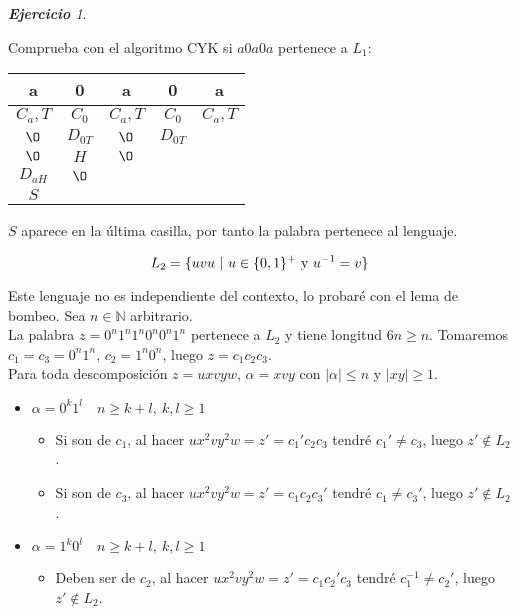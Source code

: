 \documentclass[12pt,spanish]{article}
\theoremstyle{definition}
\theoremstyle{remark}
\newtheorem{exercise}{\textbf{Ejercicio}}%
\begin{document}
\begin{exercise}
\begin{multicols}{4}
  \end{multicols}

  Comprueba con el algoritmo CYK si $a0a0a$ pertenece a $L_1$:

  \begin{table}[H]
    \centering
    \begin{tabular}{|c|cccc} \hline a & \multicolumn{1}{c|}{0} &
\multicolumn{1}{c|}{a} & \multicolumn{1}{c|}{0} &
\multicolumn{1}{c|}{a} \\ \hline $C_a,T$ & \multicolumn{1}{c|}{$C_0$}
& \multicolumn{1}{c|}{$C_a,T$} & \multicolumn{1}{c|}{$C_0$} &
\multicolumn{1}{c|}{$C_a,T$} \\ \hline $\O$ &
\multicolumn{1}{c|}{$D_{0T}$} & \multicolumn{1}{c|}{$\O$} & \multicolumn{1}{c|}{$D_{0T}$} & \\
\cline{1-4} $\O$ & \multicolumn{1}{c|}{$H$} &
\multicolumn{1}{c|}{$\O$} & & \\ \cline{1-3} $D_{aH}$ &
\multicolumn{1}{c|}{$\O$} & & & \\ \cline{1-2} $S$ & & & & \\
\cline{1-1}
    \end{tabular}
  \end{table}

  $S$ aparece en la última casilla, por tanto la palabra pertenece al
  lenguaje.

  \newpage
  
  \[L_2=\{uvu\ |\ u \in \{0,1\}^+ \text{ y } u^{-1}=v\}\vspace{5mm}\]
  
  Este lenguaje no es independiente del contexto, lo probaré con el
  lema de bombeo. Sea $n\in \mathbb{N}$ arbitrario.\\ 

  La palabra $z=0^n1^n1^n0^n0^n1^n$ pertenece a $L_2$ y tiene longitud
  $6n \geq n$. Tomaremos $c_1=c_3=0^n1^n$, $c_2=1^n0^n$, luego
  $z=c_1c_2c_3$. \\

  Para toda descomposición $z=uxvyw$, $\alpha=xvy$ con
  $|\alpha|\leq n$ y $|xy|\geq 1$.

  \begin{itemize}
  \item $\alpha = 0^k1^l \quad n \geq k+l,\ k,l\geq 1$
    \begin{itemize}
    \item Si son de $c_1$, al hacer $ux^2vy^2w=z'=c_1'c_2c_3$ tendré
      $c_1'\neq c_3$, luego $z' \notin L_2$.
    \item Si son de $c_3$, al hacer $ux^2vy^2w=z'=c_1c_2c_3'$ tendré
      $c_1\neq c_3'$, luego $z' \notin L_2$.
    \end{itemize}
  \item $\alpha = 1^k0^l \quad n \geq k+l,\ k,l\geq 1$
    \begin{itemize}
    \item Deben ser de $c_2$, al hacer $ux^2vy^2w=z'=c_1c_2'c_3$ tendré
      $c_1^{-1}\neq c_2'$, luego $z' \notin L_2$.
    \end{itemize}


\end{itemize}
\end{exercise}
\end{document}
